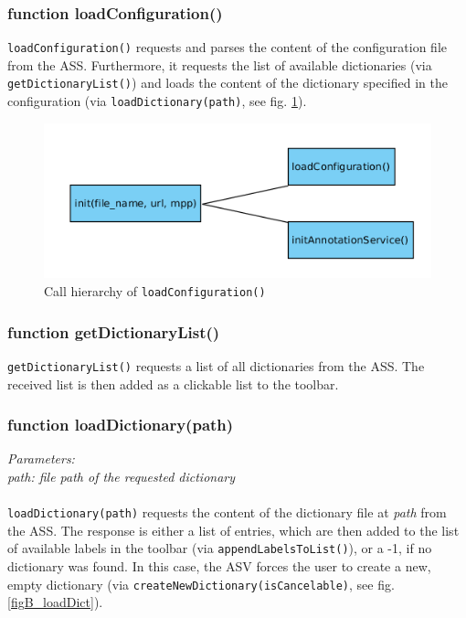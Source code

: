 \subsubsection{function loadConfiguration()}
\texttt{loadConfiguration()} requests and parses the content of the configuration file from the ASS. Furthermore, it requests the list of available dictionaries (via \texttt{getDictionaryList()}) and loads the content of the dictionary specified in the configuration (via \texttt{loadDictionary(path)}, see fig. \ref{figB_loadConfig}).

\begin{figure}[H]
	\begin{center}
		\includegraphics[scale=0.5]{img/ch_init.png}
		\caption{Call hierarchy of \texttt{loadConfiguration()}}
		\label{figB_loadConfig}
	\end{center}
\end{figure}


\subsubsection{function getDictionaryList()}
\texttt{getDictionaryList()} requests a list of all dictionaries from the ASS. The received list is then added as a clickable list to the toolbar.


\subsubsection{function loadDictionary(path)}
\emph{Parameters:\\
	path: file path of the requested dictionary\\ \\
}
\texttt{loadDictionary(path)} requests the content of the dictionary file at \emph{path} from the ASS. The response is either a list of entries, which are then added to the list of available labels in the toolbar (via \texttt{appendLabelsToList()}), or a -1, if no dictionary was found. In this case, the ASV forces the user to create a new, empty dictionary (via \texttt{createNewDictionary(isCancelable)}, see fig. \ref{figB_loadDict}).

